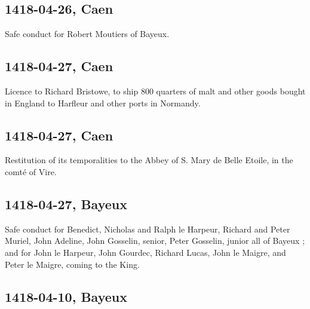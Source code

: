 \documentclass[a4paper,12pt,twoside]{book}
\begin{document}
                
                \subsection{1418-04-26, Caen}
                
                
                     Safe conduct for Robert Moutiers of Bayeux.
                  
                
                \subsection{1418-04-27, Caen}
                
                
                     Licence to Richard Bristowe, to ship 800 quarters of malt and other goods bought in England to Harfleur and other ports in Normandy.
                  
                
                \subsection{1418-04-27, Caen}
                
                
                     Restitution of its temporalities to the Abbey of S. Mary de Belle Etoile, in the comté of Vire.
                  
                
                \subsection{1418-04-27, Bayeux}
                
                
                     Safe conduct for Benedict, Nicholas and Ralph le Harpeur, Richard and Peter Muriel, John Adeline, John Gosselin, senior, Peter Gosselin, junior all of Bayeux ; and for John le Harpeur, John Gourdec, Richard Lucas, John le Maigre, and Peter le Maigre, coming to the King.
                  
                
                \subsection{1418-04-10, Bayeux}
                
\end{document}
